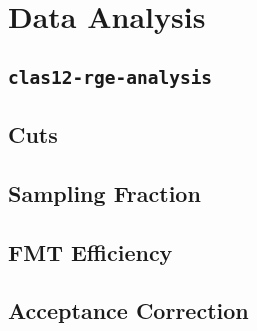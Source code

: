\section{Data Analysis}
\begin{frame}{}
    \centering \Huge{}
\end{frame}

\subsection{\texttt{clas12-rge-analysis}}


\subsection{Cuts}


\subsection{Sampling Fraction}


\subsection{FMT Efficiency}


\subsection{Acceptance Correction}

